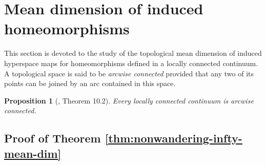 \documentclass[sn-mathphys-num]{sn-jnl}%
\theoremstyle{thmstyleone}%
\newtheorem{proposition}{Proposition}%
\theoremstyle{thmstyletwo}%
\newtheorem{remark}{Remark}%
\theoremstyle{thmstylethree}%
\begin{document}



\section{Mean dimension of induced homeomorphisms}\label{sec:mean-dimension-induced-systems}

This section is devoted to the study of the topological mean dimension of induced hyperspace maps for homeomorphisms defined in a locally connected continuum. A topological space is said to be \emph{arcwise connected} provided that any two of its points can be joined by an arc contained in this space.\\

\begin{proposition}[\cite{illanes_nadler_1999}, Theorem 10.2]\label{prop:loc-con-conti-arcwise-connected}
    Every locally connected continuum is arcwise connected.
\end{proposition}

\subsection{Proof of Theorem \ref{thm:nonwandering-infty-mean-dim}}\label{subsec:proof-thm-infty-mean-dim-closed-hyp}
\end{document}

